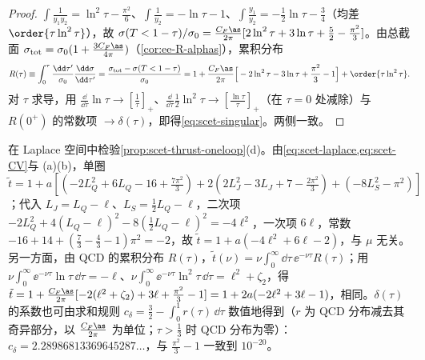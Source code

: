 \begin{proof}
$\int\frac{1}{y_1y_2}=\ln^2\tau-\frac{\pi^2}6$、$\int\frac1{y_2}=-\ln\tau-1$、$\int\frac{y_1}{y_2}=-\frac12\ln\tau-\frac34$（均差 $\order{\tau\ln^2\tau}$），故 $\sigma(T<1-\tau)/\sigma_0=\frac{C_F\as}{2\pi}[2\ln^2\tau+3\ln\tau+\frac52-\frac{\pi^2}{3}]$。由总截面 $\sigma_{\rm tot}=\sigma_0(1+\frac{3C_F\as}{4\pi})$（\cref{cor:ee-R-alphas}），累积分布
\[
R(\tau)\equiv\int_0^\tau\frac{\dd\tau'}{\sigma_0}\frac{\dd\sigma}{\dd\tau'}=\frac{\sigma_{\rm tot}-\sigma(T<1-\tau)}{\sigma_0}=1+\frac{C_F\as}{2\pi}\Big[-2\ln^2\tau-3\ln\tau+\frac{\pi^2}{3}-1\Big]+\order{\tau\ln^2\tau}.
\]
对 $\tau$ 求导，用 $\frac{\dd}{\dd\tau}\ln\tau\to[\frac1\tau]_+$、$\frac{\dd}{\dd\tau}\frac12\ln^2\tau\to[\frac{\ln\tau}\tau]_+$（在 $\tau=0$ 处减除）与 $R(0^+)$ 的常数项 $\to\delta(\tau)$，即得\cref{eq:scet-singular}。两侧一致。
\end{proof}

\begin{example}\label{ex:scet-thrust-oneloop}
在 Laplace 空间中检验\cref{prop:scet-thrust-oneloop}(d)。由\cref{eq:scet-laplace,eq:scet-CV}与 (a)(b)，单圈 $\tilde t=1+a[(-2L_Q^2+6L_Q-16+\tfrac{7\pi^2}3)+2(2L_J^2-3L_J+7-\tfrac{2\pi^2}{3})+(-8L_S^2-\pi^2)]$；代入 $L_J=L_Q-\ell$、$L_S=\frac12L_Q-\ell$，二次项 $-2L_Q^2+4(L_Q-\ell)^2-8(\frac12L_Q-\ell)^2=-4\ell^2$，一次项 $6\ell$，常数 $-16+14+(\frac73-\frac43-1)\pi^2=-2$，故 $\tilde t=1+a(-4\ell^2+6\ell-2)$，与 $\mu$ 无关。另一方面，由 QCD 的累积分布 $R(\tau)$，$\tilde t(\nu)=\nu\int_0^\infty\dd\tau\,\ee^{-\nu\tau}R(\tau)$；用 $\nu\int_0^\infty\ee^{-\nu\tau}\ln\tau\,\dd\tau=-\ell$、$\nu\int_0^\infty\ee^{-\nu\tau}\ln^2\tau\,\dd\tau=\ell^2+\zeta_2$，得 $\tilde t=1+\frac{C_F\as}{2\pi}[-2(\ell^2+\zeta_2)+3\ell+\frac{\pi^2}{3}-1]=1+2a(-2\ell^2+3\ell-1)$，相同。$\delta(\tau)$ 的系数也可由求和规则 $c_\delta=\frac32-\int_0^1r(\tau)\,\dd\tau$ 数值地得到（$r$ 为 QCD 分布减去其奇异部分，以 $\frac{C_F\as}{2\pi}$ 为单位；$\tau>\frac13$ 时 QCD 分布为零）：$c_\delta=2.28986813369645287\ldots$，与 $\frac{\pi^2}{3}-1$ 一致到 $10^{-20}$。%
\end{example}

